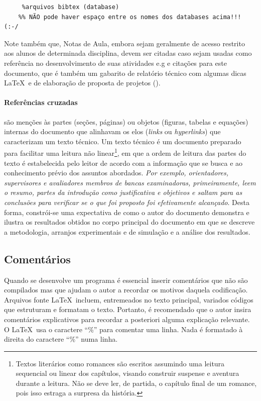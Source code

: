 \begin{lstlisting}[language={[Latex]Tex},frame=single]
	 % estilo escolhido para formatar a bibliografia
	 %arquivos bibtex (database)
	%% NÃO pode haver espaço entre os nomes dos databases acima!!! (:-/ 
\end{lstlisting}

Note também que, Notas de Aula, embora sejam geralmente de acesso restrito aos alunos de determinada disciplina,  devem ser citadas caso sejam  usadas como referência no desenvolvimento de suas atividades e.g \cite{BragaAR2019} e citações para este documento, que é também um gabarito de relatório técnico com algumas dicas \LaTeX\ e de elaboração de proposta de projetos (\cite{bragaAR2021}).

\paragraph{Referências cruzadas} são menções às partes (seções, páginas) ou objetos (figuras, tabelas e equações) internas do documento que alinhavam os elos (\emph{links} ou \emph{hyperlinks}) que caracterizam um texto técnico. Um texto técnico é um documento preparado para facilitar uma leitura não linear\footnote{%
	Textos literários como romances são escritos assumindo uma leitura sequencial ou linear dos capítulos, visando construir suspense e aventura durante a leitura. Não se deve ler, de partida, o capítulo final de um romance, pois isso estraga a surpresa da história.}, %
 em que a ordem de leitura das partes do texto é estabelecida pelo leitor de acordo com a informação que se busca e ao conhecimento prévio dos assuntos abordados.  \emph{Por exemplo, orientadores, supervisores e avaliadores membros de bancas examinadoras, primeiramente, leem o resumo, partes da introdução como justificativa e objetivos e saltam para as conclusões para verificar se o que foi  proposto foi efetivamente  alcançado}. Desta forma, constrói-se uma expectativa de como o autor do documento demonstra e ilustra os resultados obtidos no corpo principal do documento em que se descreve a metodologia, arranjos experimentais e de simulação e a análise dos resultados.

\subsection{Comentários}

Quando se desenvolve um programa é essencial inserir comentários que não são compilados mas que ajudam o autor a recordar os motivos daquela codificação. Arquivos fonte  \LaTeX\ incluem, entremeados no texto principal,  variados códigos que estruturam e formatam o texto. Portanto, é recomendado que o autor insira comentários explicativos para recordar a posteriori alguma explicação relevante. O \LaTeX\ usa o caractere ``\%''   para comentar uma linha. Nada é formatado à direita  do caractere ``\%'' numa linha.

